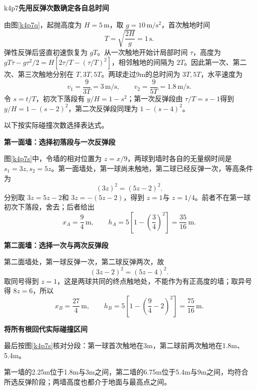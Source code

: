 \begin{drillsolution}{k4p7}\textbf{先用反弹次数确定各自总时间}\par\nobreak
由图\ref{k4p7q}，起抛高度为 $H=5\,\mathrm m$，取 $g=10\,\mathrm{m/s^2}$，首次触地时间
\[
 T=\sqrt{\frac{2H}{g}}=1\,\mathrm s.
\]
弹性反弹后竖直初速恢复为 $gT$。从一次触地开始计局部时间 $\tau$，高度为 $gT\tau-g\tau^2/2=H[2\tau/T-(\tau/T)^2]$，相邻触地的间隔为 $2T$。因此第一次、第二次、第三次触地分别在 $T,3T,5T$。两球走过9m的总时间为 $3T,5T$，水平速度为
\[
 \boxed{v_1=\frac9{3T}=3\,\mathrm{m/s}},\qquad
 \boxed{v_2=\frac9{5T}=1.8\,\mathrm{m/s}}.
\]
令 $s=t/T$，初次下落段有 $y/H=1-s^2$；第一次反弹段由 $\tau/T=s-1$得到 $y/H=1-(s-2)^2$，第二次反弹段同理为 $1-(s-4)^2$。

以下按实际碰撞次数选择表达式。



\par\medskip{}\noindent\textbf{第一面墙：选择初落段与一次反弹段}\par\nobreak
图\ref{k4p7s}中，令墙的相对位置为 $z=x/9$，两球到墙时各自的无量纲时间是 $s_1=3z,s_2=5z$。第一面墙处，第一球尚未触地，第二球已经反弹一次，等高条件为
\[
 (3z)^2=(5z-2)^2.
\]
分别取 $3z=5z-2$和 $3z=-(5z-2)$，得到 $z=1$与 $z=1/4$。前者不在第一球初次下落段，舍去；后者给出
\[
 \boxed{x_A=\frac94\,\mathrm m},\qquad
 h_A=5\left[1-\left(\frac34\right)^2\right]
 =\boxed{\frac{35}{16}\,\mathrm m}.
\]


\par\medskip{}\noindent\textbf{第二面墙：选择一次与两次反弹段}\par\nobreak
第二面墙处，第一球反弹一次，第二球反弹两次，故
\[
 (3z-2)^2=(5z-4)^2.
\]
取同号得到 $z=1$，这是两球共同的终点触地处，不能作为有正高度的墙；取异号得 $8z=6$，所以
\[
 \boxed{x_B=\frac{27}{4}\,\mathrm m},\qquad
 h_B=5\left[1-\left(\frac94-2\right)^2\right]
 =\boxed{\frac{75}{16}\,\mathrm m}.
\]


\par\medskip{}\noindent\textbf{将所有根回代实际碰撞区间}\par\nobreak
最后按图\ref{k4p7s}核对分段：第一球首次触地在3m，第二球前两次触地在1.8m、5.4m。

第一墙的2.25m位于1.8m与3m之间，第二墙的6.75m位于5.4m与9m之间，均符合所选反弹阶段；两墙高度也都介于地面与最高点之间。
\end{drillsolution}

